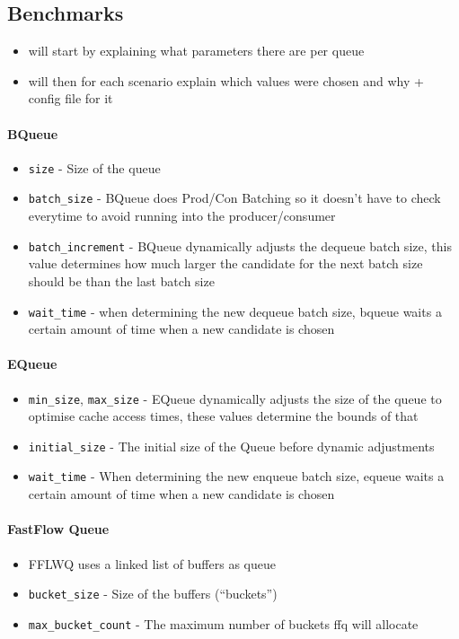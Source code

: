 \subsection{Benchmarks}
\begin{itemize}
    \item will start by explaining what parameters there are per queue
    \item will then for each scenario explain which values were chosen and why + config file for it
\end{itemize}

\paragraph{BQueue}
\begin{itemize}
    \item \texttt{size} - Size of the queue
    \item \texttt{batch\_size} - BQueue does Prod/Con Batching so it doesn't have to check everytime to avoid
        running into the producer/consumer
    \item \texttt{batch\_increment} - BQueue dynamically adjusts the dequeue batch size, this value
        determines how much larger the candidate for the next batch size should be than the last batch size
    \item \texttt{wait\_time} - when determining the new dequeue batch size, bqueue waits a certain amount of
        time when a new candidate is chosen
\end{itemize}

\paragraph{EQueue}
\begin{itemize}
    \item \texttt{min\_size}, \texttt{max\_size} - EQueue dynamically adjusts the size of the queue to
        optimise cache access times, these values determine the bounds of that
    \item \texttt{initial\_size} - The initial size of the Queue before dynamic adjustments
    \item \texttt{wait\_time} - When determining the new enqueue batch size, equeue waits a certain amount of
        time when a new candidate is chosen
\end{itemize}

\paragraph{FastFlow Queue}
\begin{itemize}
    \item FFLWQ uses a linked list of buffers as queue 
    \item \texttt{bucket\_size} - Size of the buffers (``buckets'')
    \item \texttt{max\_bucket\_count} - The maximum number of buckets ffq will allocate
\end{itemize}

